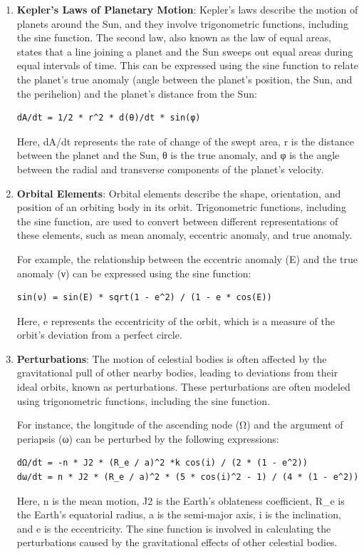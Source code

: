 \documentclass[
]{article}
\begin{document}
\begin{enumerate}
\def\labelenumi{\arabic{enumi}.}
\item
  \textbf{Kepler's Laws of Planetary Motion}: Kepler's laws describe the
  motion of planets around the Sun, and they involve trigonometric
  functions, including the sine function. The second law, also known as
  the law of equal areas, states that a line joining a planet and the
  Sun sweeps out equal areas during equal intervals of time. This can be
  expressed using the sine function to relate the planet's true anomaly
  (angle between the planet's position, the Sun, and the perihelion) and
  the planet's distance from the Sun:

\begin{verbatim}
dA/dt = 1/2 * r^2 * d(θ)/dt * sin(φ)
\end{verbatim}

  Here, dA/dt represents the rate of change of the swept area, r is the
  distance between the planet and the Sun, θ is the true anomaly, and φ
  is the angle between the radial and transverse components of the
  planet's velocity.
\item
  \textbf{Orbital Elements}: Orbital elements describe the shape,
  orientation, and position of an orbiting body in its orbit.
  Trigonometric functions, including the sine function, are used to
  convert between different representations of these elements, such as
  mean anomaly, eccentric anomaly, and true anomaly.

  For example, the relationship between the eccentric anomaly (E) and
  the true anomaly (ν) can be expressed using the sine function:

\begin{verbatim}
sin(ν) = sin(E) * sqrt(1 - e^2) / (1 - e * cos(E))
\end{verbatim}

  Here, e represents the eccentricity of the orbit, which is a measure
  of the orbit's deviation from a perfect circle.
\item
  \textbf{Perturbations}: The motion of celestial bodies is often
  affected by the gravitational pull of other nearby bodies, leading to
  deviations from their ideal orbits, known as perturbations. These
  perturbations are often modeled using trigonometric functions,
  including the sine function.

  For instance, the longitude of the ascending node (Ω) and the argument
  of periapsis (ω) can be perturbed by the following expressions:

\begin{verbatim}
dΩ/dt = -n * J2 * (R_e / a)^2 *k cos(i) / (2 * (1 - e^2))
dω/dt = n * J2 * (R_e / a)^2 * (5 * cos(i)^2 - 1) / (4 * (1 - e^2))
\end{verbatim}

  Here, n is the mean motion, J2 is the Earth's oblateness coefficient,
  R\_e is the Earth's equatorial radius, a is the semi-major axis, i is
  the inclination, and e is the eccentricity. The sine function is
  involved in calculating the perturbations caused by the gravitational
  effects of other celestial bodies.
\end{enumerate}
\end{document}
